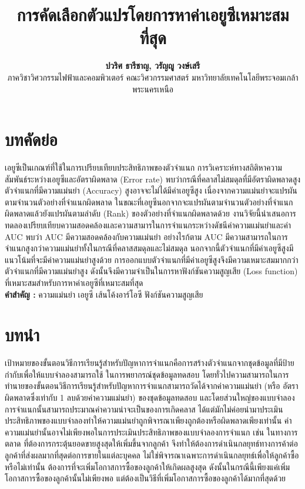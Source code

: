 \documentclass[twoside, twocolumn, 12pt]{article}
\title{\textbf{การคัดเลือกตัวแปรโดยการหาค่าเอยูซีเหมาะสมที่สุด}}
\author{%
\textbf{ปวริศ ธารีชาญ, วรัญญู วงษ์เสรี}\\[1ex]
ภาควิชาวิศวกรรมไฟฟ้าและคอมพิวเตอร์ คณะวิศวกรรมศาสตร์ มหาวิทยาลัยเทคโนโลยีพระจอมเกล้าพระนครเหนือ %
}
\date{}
\begin{document}
\maketitle
\section*{บทคัดย่อ}
\quad เอยูซีเป็นเกณฑ์ที่ใช้ในการเปรียบเทียบประสิทธิภาพของตัวจำแนก การวิเคราะห์ทางสถิติหาความสัมพันธ์ระหว่างเอยูซีและอัตราผิดพลาด (Error rate) พบว่ากรณีที่คลาสไม่สมดุลที่มีอัตราผิดพลาดสูง ตัวจำแนกที่มีความแม่นยำ (Accuracy) สูงอาจจะไม่ได้มีค่าเอยูซีสูง เนื่องจากความแม่นยำจะแปรผันตามจำนวนตัวอย่างที่จำแนกผิดพลาด ในขณะที่เอยูซีนอกจากจะแปรผันตามจำนวนตัวอย่างที่จำแนกผิดพลาดแล้วยังแปรผันตามลำดับ (Rank) ของตัวอย่างที่จำแนกผิดพลาดด้วย งานวิจัยนี้นำเสนอการทดลองเปรียบเทียบความสอดคล้องและความสามารในการจำแนกระหว่างดัชนีค่าความแม่นยำและค่า AUC พบว่า AUC มีความสอดคล้องกับความแม่นยำ อย่างไรก้ตาม AUC มีความสามารถในการจำแนกสูงกว่าความแม่นยำทั้งในกรณีที่คลาสสมดุลและไม่สมดุล นอกจากนี้ตัวจำแนกที่มีค่าเอยูซีสูงมีแนวโน้มที่จะมีค่าความแม่นยำสูงด้วย การออกแบบตัวจำแนกที่มีค่าเอยูซีสูงจึงมีความเหมาะสมมากกว่าตัวจำแนกที่มีความแม่นยำสูง ดังนั้นจึงมีความจำเป็นในการหาฟังก์ชันความสูญเสีย (Loss function) ที่เหมาะสมสำหรับการหาค่าเอยูซีที่เหมาะสมที่สุด
\\

\textbf{คำสำคัญ :} ความแม่นยำ เอยูซี เส้นโค้งอาร์โอซี ฟังก์ชันความสูญเสีย

\section{บทนำ}
เป้าหมายของขั้นตอนวิธีการเรียนรู้สำหรับปัญหาการจำแนกคือการสร้างตัวจำแนกจากชุดข้อมูลที่มีป้ายกำกับเพื่อให้แบบจำลองสามารถใช้ ในการพยากรณ์ชุดข้อมูลทดสอบ โดยทั่วไปความสามารถในการทำนายของขั้นตอนวิธีการเรียนรู้สำหรับปัญหาการจำแนกสามารถวัดได้จากค่าความแม่นยำ (หรือ อัตราผิดพลาดซึ่งเท่ากับ 1 ลบด้วยค่าความแม่นยำ) ของชุดข้อมูลทดสอบ และโดยส่วนใหญ่ของแบบจำลองการจำแนกนั้นสามารถประมาณค่าความน่าจะเป็นของการเกิดคลาส ได้แต่มักไม่ค่อยนำมาประเมินประสิทธิภาพของแบบจำลองทำให้ความแม่นยำถูกพิจารณาเพียงถูกต้องหรือผิดพลาดเพียงเท่านั้น 
ค่าความแม่นยำนั้นอาจไม่เพียงพอในการประเมินประสิทธิภาพของแบบจำลองการจำแนก เช่น ในทางการตลาด ที่ต้องการกระตุ้นยอดขายสูงสุดให้เพิ่มขึ้นจากลูกค้า จึงทำให้ต้องการดําเนินกลยุทธ์ทางการค้าต่อลูกค้าที่ส่งผลมากที่สุดต่อการขายในแต่ละบุคคล ไม่ใช่พิจารณาเฉพาะการดำเนินกลยุทธ์เพื่อให้ลูกค้าซื้อหรือไม่เท่านั้น ต้องการที่จะเพิ่มโอกาสการซื้อของลูกค้าให้เกิดผลสูงสุด ดังนั้นในกรณีนี้เพียงแค่เพิ่มโอกาสการซื้อของลูกค้านั้นไม่เพียงพอ แต่ต้องเป็นวิธีที่เพิ่มโอกาสการซื้อของลูกค้าได้มากที่สุดด้วย \cite{1}
\end{document}
